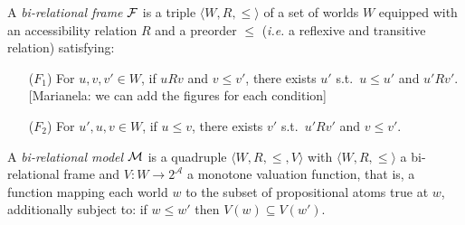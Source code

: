 \documentclass[twoside]{aiml18}
\newcommand{\marianela}[1]{{\color{purple}[Marianela: #1]}}
\newcommand*{\rel}{R}
\begin{document}
\begin{definition}
	A \emph{bi-relational frame} $\mathcal{F}$ is a triple $\langle W, R, \le \rangle$ 
	of a set of worlds $W$ equipped with an {accessibility relation} $\rel$ and a preorder $\le$ (\emph{i.e.} a reflexive and transitive relation) satisfying:
	\begin{enumerate}
		\item[($F_1$)] For $u, v, v' \in W$, if $u \rel v$ and $v \le v'$, there exists $u'$ s.t.~$u \le u'$ and $u' \rel v'$.
		\marianela{we can add the figures for each condition}
		
		\item[($F_2$)] For $u', u, v \in W$, if $u \le v$, there exists $v'$ s.t.~$u' \rel v'$ and $v\le v'$.
	\end{enumerate}
%	
\end{definition}

\begin{definition}
	A \emph{bi-relational model} $\mathcal{M}$ is a quadruple $\langle W, R,\le,V \rangle$ with $\langle W, R, \le \rangle$ a bi-relational frame and $V\colon W \to 2^\mathcal{A}$ a monotone valuation function, that is, a function mapping each world $w$ to the subset of propositional atoms true at $w$, additionally subject to:
	if $w \le w'$ then $V(w)\subseteq V(w')$.
\end{definition}
\end{document}
